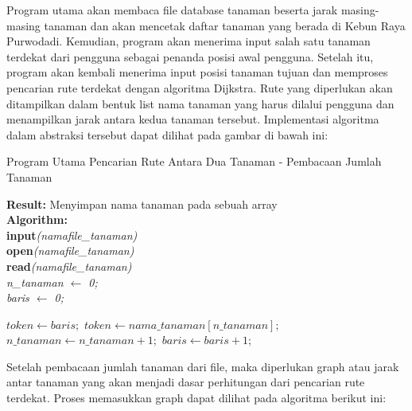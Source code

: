 \documentclass[conference]{IEEEtran}
\begin{document}
    Program utama akan membaca file database tanaman beserta jarak masing-masing tanaman dan akan mencetak daftar tanaman yang berada di Kebun Raya Purwodadi. Kemudian, program akan menerima input salah satu tanaman terdekat dari pengguna sebagai penanda posisi awal pengguna. Setelah itu, program akan kembali menerima input posisi tanaman tujuan dan memproses pencarian rute terdekat dengan algoritma Dijkstra. Rute yang diperlukan akan ditampilkan dalam bentuk list nama tanaman yang harus dilalui pengguna dan menampilkan jarak antara kedua tanaman tersebut. Implementasi algoritma dalam abstraksi tersebut dapat dilihat pada gambar di bawah ini:

    \begin{algorithm}
        \caption{Program Utama Pencarian Rute Antara Dua Tanaman - Pembacaan Jumlah Tanaman} 
        \textbf{Result: } Menyimpan nama tanaman pada sebuah array\\
        \textbf{Algorithm: }\\
        \textbf{input}\textit{(namafile\_tanaman)}\\
        \textbf{open}\textit{(namafile\_tanaman)}\\
        \textbf{read}\textit{(namafile\_tanaman)}\\
        \textit{n\_tanaman $\leftarrow$ 0;}\\
        \textit{baris $\leftarrow$ 0;}
        \begin{algorithmic}[1]
                \State $token \leftarrow baris;$
                \State $token \leftarrow nama\_tanaman[n\_tanaman];$
                \State $n\_tanaman \leftarrow n\_tanaman+1;$
                \State $baris \leftarrow baris+1;$
        \end{algorithmic}
    \end{algorithm}

    Setelah pembacaan jumlah tanaman dari file, maka diperlukan graph atau jarak antar tanaman yang akan menjadi dasar perhitungan dari pencarian rute terdekat. Proses memasukkan graph dapat dilihat pada algoritma berikut ini:
\end{document}
